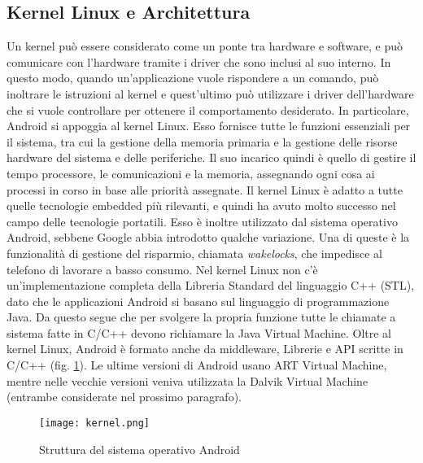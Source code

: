 \subsection{Kernel Linux e Architettura}
Un kernel può essere considerato come un ponte tra hardware e software, e può comunicare con
l’hardware tramite i driver che sono inclusi al suo interno. In questo modo, quando
un’applicazione vuole rispondere a un comando, può inoltrare le istruzioni al
kernel e quest’ultimo può utilizzare i driver dell’hardware che si vuole
controllare per ottenere il comportamento desiderato. In particolare, Android si
appoggia al kernel Linux. Esso fornisce
tutte le funzioni essenziali per il sistema, tra cui la gestione della memoria
primaria e la gestione delle risorse hardware del sistema e delle periferiche.
Il suo incarico quindi è quello di gestire
il tempo processore, le comunicazioni e la memoria, assegnando ogni cosa ai processi in
corso in base alle priorità assegnate. Il kernel Linux è adatto a tutte quelle
tecnologie embedded più rilevanti, e quindi ha avuto molto successo nel campo
delle tecnologie portatili.
Esso è inoltre utilizzato dal sistema operativo Android, sebbene Google abbia
introdotto qualche variazione. Una di queste è la funzionalità di gestione
del risparmio, chiamata \textit{wakelocks}, che impedisce al telefono di lavorare a
basso consumo. Nel kernel Linux non c’è un’implementazione completa della
Libreria Standard del linguaggio C++ (STL), dato che le applicazioni Android si
basano sul linguaggio di programmazione Java. Da questo segue che per svolgere
la propria funzione tutte le chiamate a
sistema fatte in C/C++ devono richiamare la Java Virtual Machine. Oltre al
kernel Linux, Android è formato anche da  middleware, Librerie e API scritte in
C/C++ (fig. \ref{kernel}). Le
ultime versioni di Android usano ART Virtual Machine, mentre nelle vecchie versioni
veniva utilizzata la Dalvik Virtual Machine (entrambe considerate nel prossimo
paragrafo).
\begin{figure}
    \centering
    \texttt{[image: kernel.png]}
    \caption{Struttura del sistema operativo Android \cite{4}}
    \label{kernel}
\end{figure}

